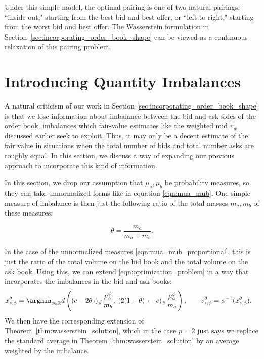Under this simple model, the optimal pairing is one of two natural pairings:
``inside-out," starting from the best bid and best offer, or ``left-to-right,"
starting from the worst bid and best offer. The Wasserstein formulation in
Section~\ref{sec:incorporating_order_book_shape} can be viewed as a continuous
relaxation of this pairing problem.


\section{Introducing Quantity Imbalances}
\label{sec:quantity_imbalances}

A natural criticism of our work in Section \ref{sec:incorporating_order_book_shape}
 is that we lose information about imbalance between the bid and ask
  sides of the order book, imbalances which fair-value estimates
  like the weighted mid $v_w$ discussed earlier seek to exploit.
  Thus, it may only be a decent estimate of the fair value in
  situations when the total number of bids and total number asks
   are roughly equal. In this section, we discuss a way of expanding
   our previous approach to incorporate this kind of information.

In this section, we drop our assumption that $\mu_a, \mu_b$ be
probability measures, so they can take unnormalized forms like in
equation \eqref{eqn:mua_mub}. One simple measure of imbalance is
then just the following ratio of the total masses $m_a, m_b$ of
these measures:
%

\begin{equation}
    \theta = \frac{m_a}{m_a + m_b}.
    \label{eqn:imbalance_ratio_theta}
\end{equation}

%

\noindent In the case of the unnormalized measures
\eqref{eqn:mua_mub_proportional}, this is just the ratio of the total
volume on the bid book and the total volume on the ask book.
Using this, we can extend \eqref{eqn:optimization_problem} in a way
 that incorporates the imbalances in the bid and ask books:
%
\begin{align}
        x_{s,\phi}^\theta & = \argmin_{c \in \mathbb R}
        d\left((c-2\theta\,\cdot)_\#\frac{\mu_b^\phi}{m_b},\;
        (2(1-\theta)\,\cdot-c)_\#\frac{\mu_a^\phi}{m_a}\right),
        \qquad v_{s,\phi}^\theta=\phi^{-1}(x_{s,\phi}^\theta).
        \label{eqn:imbalanced_optimization_problem}
\end{align}
%
\noindent We then have the corresponding extension of
Theorem~\ref{thm:wasserstein_solution}, which in the case $p=2$
just says we replace the standard average in
Theorem~\ref{thm:wasserstein_solution} by an average weighted
 by the imbalance.

